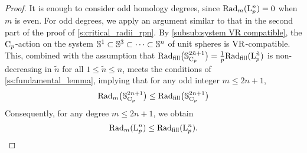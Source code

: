 \begin{proof}
    It is enough to consider odd homology degrees, since $\mathrm{Rad}_{m}(\mathrm{L}^n_p) = 0$ when $m$ is even.
    For odd degrees, we apply an argument similar to that in the second part of the proof of \cref{s:critical_radii_rpn}.
    By \cref{subsub:system VR compatible}, the $\mathrm{C}_p$-action on the system $\mathbb{S}^1 \subset \mathbb{S}^3 \subset \dotsb \subset \mathbb{S}^n$ of unit spheres is \(\mathrm{VR}\)-compatible. 
    This, combined with the assumption that $\mathrm{Rad}_{\mathrm{fill}}\big(\mathbb{S}^{2\tilde{n}+1}_{\mathrm{C}_p}\big) = \tfrac{1}{p} \mathrm{Rad}_{\mathrm{fill}}(\mathrm{L}^{\tilde{n}}_p)$ is non-decreasing in $\tilde{n}$ for all $1\leq \tilde{n} \leq n$, meets the conditions of \cref{ss:fundamental_lemma}, implying that for any odd integer $m \leq 2n+1$,
    \[
    \mathrm{Rad}_m\big(\mathbb{S}^{2n+1}_{\mathrm{C}_p}\big) \leq \mathrm{Rad}_{\mathrm{fill}}\big(\mathbb{S}^{2n+1}_{\mathrm{C}_p}\big)
    \]
    Consequently, for any degree $m \leq 2n+1$, we obtain
    \[
    \firstdeath{m}{\rL^n_p} \leq \fillrad(\rL^n_p). %
    \qedhere
    \]
\end{proof}


